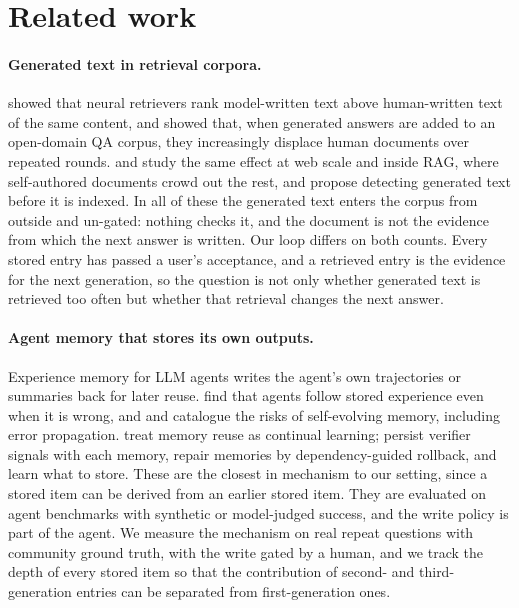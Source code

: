 \documentclass[11pt]{article}
\begin{document}
\section{Related work}
\paragraph{Generated text in retrieval corpora.} \citet{dai2024sourcebias} showed that neural retrievers rank model-written text above human-written text of the same content, and \citet{chen2024spiral} showed that, when generated answers are added to an open-domain QA corpus, they increasingly displace human documents over repeated rounds. \citet{yu2026collapse} and \citet{druck2026ragcollapse} study the same effect at web scale and inside RAG, where self-authored documents crowd out the rest, and \citet{llmtextharm2026} propose detecting generated text before it is indexed. In all of these the generated text enters the corpus from outside and un-gated: nothing checks it, and the document is not the evidence from which the next answer is written. Our loop differs on both counts. Every stored entry has passed a user's acceptance, and a retrieved entry is the evidence for the next generation, so the question is not only whether generated text is retrieved too often but whether that retrieval changes the next answer.

\paragraph{Agent memory that stores its own outputs.} Experience memory for LLM agents writes the agent's own trajectories or summaries back for later reuse. \citet{xiong2025memory} find that agents follow stored experience even when it is wrong, and \citet{shao2025misevolve} and \citet{xie2026memevobench} catalogue the risks of self-evolving memory, including error propagation. \citet{hu2026continual} treat memory reuse as continual learning; \citet{wang2026memguard} persist verifier signals with each memory, \citet{yu2026rollback} repair memories by dependency-guided rollback, and \citet{zhang2026memrl} learn what to store. These are the closest in mechanism to our setting, since a stored item can be derived from an earlier stored item. They are evaluated on agent benchmarks with synthetic or model-judged success, and the write policy is part of the agent. We measure the mechanism on real repeat questions with community ground truth, with the write gated by a human, and we track the depth of every stored item so that the contribution of second- and third-generation entries can be separated from first-generation ones.
\end{document}
